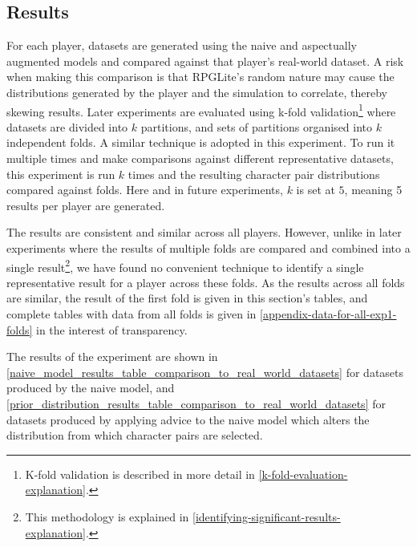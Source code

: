 \subsection{Results}

For each player, datasets are generated using the naive and aspectually
augmented models and compared against that player's real-world dataset. A risk
when making this comparison is that RPGLite's random nature may cause the
distributions generated by the player and the simulation to correlate, thereby
skewing results. Later experiments are evaluated using k-fold
validation\footnote{K-fold validation is described in more detail in
\cref{k-fold-evaluation-explanation}.} where datasets are divided into $k$
partitions, and sets of partitions organised into $k$ independent folds. A
similar technique is adopted in this experiment. To run
it multiple times and make comparisons against different
representative datasets, this experiment is run $k$ times and the resulting
character pair distributions compared against folds. Here and in future
experiments, $k$ is set at $5$, meaning 5 results per player are generated.

The results are consistent and similar across all players. However, unlike in
later experiments where the results of multiple folds are compared and combined
into a single result\footnote{This methodology is explained in
\cref{identifying-significant-results-explanation}.}, we have found no convenient
technique to identify a single representative result for a player across these
folds. As the results across all folds are similar, the result of the first fold
is given in this section's tables, and complete tables with data from all folds
is given in \cref{appendix-data-for-all-exp1-folds} in the interest of transparency.

The results of the experiment are shown in
\cref{naive_model_results_table_comparison_to_real_world_datasets} for datasets
produced by the naive model, and
\cref{prior_distribution_results_table_comparison_to_real_world_datasets} for
datasets produced by applying advice to the naive model which alters the
distribution from which character pairs are selected. 

